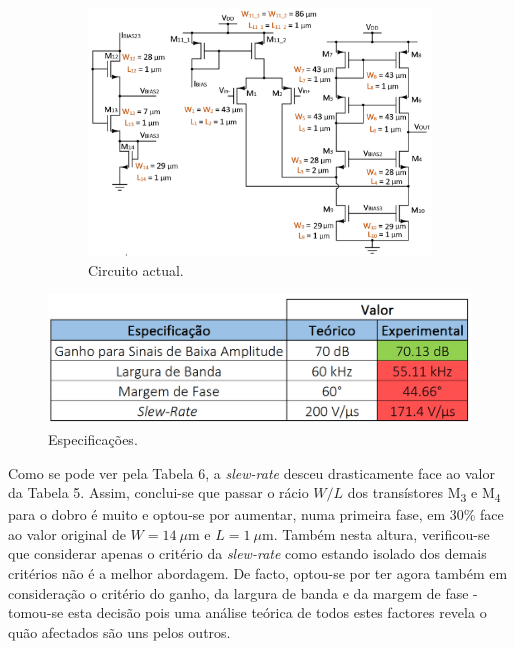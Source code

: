 \documentclass[11pt]{article}
\numberwithin{equation}{section}
\begin{document}
\begin{figure}[H]
	\centering
	\begin{minipage}[c]{0.58\textwidth}
		\begin{figure}[H]
			\includegraphics[keepaspectratio=true, scale=0.34]{teoricas/ajuste2}
			\caption{Circuito actual.}
			\vspace{-0.8em}
		\end{figure}
	\end{minipage}
	\begin{minipage}[c]{0.24\textwidth}
		\centering
		\begin{table}[H]
			\centering
			\caption{Especificações.}
			\vspace{-1.5mm}
			\includegraphics[keepaspectratio=true, scale=0.33]{teoricas/tabajuste2}
		\end{table}
	\end{minipage}	
\end{figure}

Como se pode ver pela Tabela 6, a \textit{slew-rate} desceu drasticamente face ao valor da Tabela 5. Assim, conclui-se que passar o rácio $W/L$ dos transístores M\textsubscript{3} e M\textsubscript{4} para o dobro é muito e optou-se por aumentar, numa primeira fase, em 30\% face ao valor original de $W = 14~\mu$m e $L = 1~\mu$m. Também nesta altura, verificou-se que considerar apenas o critério da \textit{slew-rate} como estando isolado dos demais critérios não é a melhor abordagem. De facto, optou-se por ter agora também em consideração o critério do ganho, da largura de banda e da margem de fase - tomou-se esta decisão pois uma análise teórica de todos estes factores revela o quão afectados são uns pelos outros.
\end{document}
